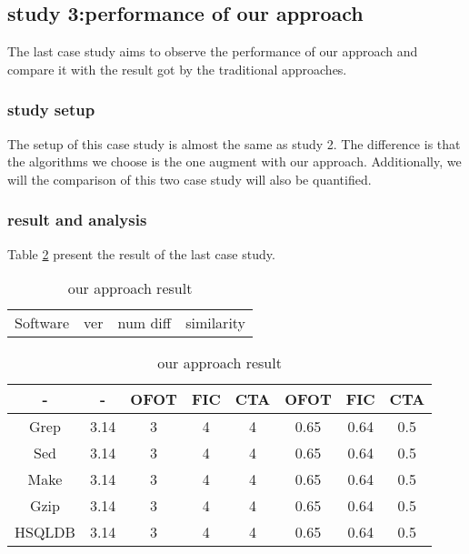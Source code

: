\documentclass{sig-alternate}
\begin{document}
\subsection{study 3:performance of our approach}
The last case study aims to observe the performance of our approach and compare it with the result got by the traditional approaches.

\subsubsection{study setup}
The setup of this case study is almost the same as study 2. The difference is that the algorithms we choose is the one augment with our approach.  Additionally, we will the comparison of this two case study will also be quantified. 

\subsubsection{result and analysis}
Table \ref{our_result} present the result of the last case study.

\begin{table}\renewcommand{\arraystretch}{1.3}
\caption{our approach result}
\label{our_result}
\begin{tabular}{p{}|p{}|p{}|p{}} \hline
   Software & ver  &  num diff & similarity
\end{tabular}

\begin{tabular}{c|c|c|c|c|c|c|c} \hline
- & - & OFOT & FIC & CTA & OFOT & FIC & CTA  \\ \hline
Grep & 3.14 & 3 & 4 & 4 & 0.65 & 0.64&  0.5 \\ \hline
Sed & 3.14 & 3 & 4 & 4 & 0.65 & 0.64&  0.5 \\ \hline
Make & 3.14 & 3 & 4 & 4 & 0.65 & 0.64&  0.5 \\ \hline
Gzip & 3.14 & 3 & 4 & 4 & 0.65 & 0.64&  0.5 \\ \hline
HSQLDB & 3.14 & 3 & 4 & 4 & 0.65 & 0.64&  0.5 \\
\hline\end{tabular}
\end{table}
\end{document}
